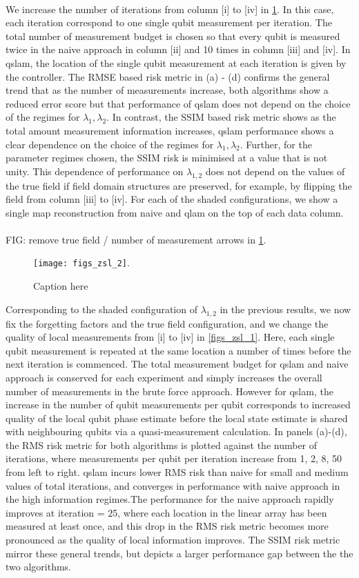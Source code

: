 \\
We increase the number of iterations from column [i] to [iv] in \cref{figs_zsl_2}. In this case, each iteration correspond to one single qubit measurement per iteration. The total number of measurement budget is chosen so that every qubit is measured twice in the naive approach in column [ii] and 10 times in column [iii] and [iv]. In qslam, the location of the single qubit measurement at each iteration is given by the controller.  The RMSE based risk metric in (a) - (d) confirms the general trend that as the number of measurements increase, both algorithms show a reduced error score but that performance of qslam does not depend on the choice of the regimes for $\lambda_1, \lambda_2$. In contrast, the SSIM based risk metric shows as the total amount measurement information increases, qslam performance shows a clear dependence on the choice of the regimes for $\lambda_1, \lambda_2$. Further, for the parameter regimes chosen, the SSIM risk is minimised at a value that is not unity. This dependence of performance on $\lambda_{1,2}$ does not depend on the values of the true field if field domain structures are preserved, for example, by flipping the field from column [iii] to [iv]. For each of the shaded configurations, we show a single map reconstruction from naive and qlam on the top of each data column.\\
\\
FIG: remove true field  / number of measurement arrows in \cref{figs_zsl_2}. 
\begin{figure}[H]
	\texttt{[image: figs\_zsl\_2]}. 
	\caption{\label{figs_zsl_2} Caption here}    	
\end{figure}
Corresponding to the shaded configuration of $\lambda_{1,2}$ in the previous results, we now fix the forgetting factors and the true field configuration, and we change the quality of local measurements from [i] to [iv] in \cref{figs_zsl_1}. Here, each single qubit measurement is repeated at the same location a number of times before the next iteration is commenced. The total measurement budget for qslam and naive approach is conserved for each experiment and simply increases the overall number of measurements in the brute force approach. However for qslam, the increase in the number of qubit measurements per qubit corresponds to increased quality of the local qubit phase estimate before the local state estimate is shared with neighbouring qubits via a quasi-measurement calculation. In panels (a)-(d), the RMS risk metric for both algorithms is plotted against the number of iterations, where measurements per qubit per iteration increase from 1, 2, 8, 50 from left to right. qslam incurs lower RMS risk than naive for  small and medium values of total iterations, and converges in performance with naive approach in the high information regimes.The performance for the naive approach rapidly improves at iteration = 25, where each location in the linear array has been measured at least once, and this drop in the RMS risk metric becomes more pronounced as the quality of local information improves.  The SSIM risk metric mirror these general trends, but depicts a larger performance gap between the the two algorithms.\\
